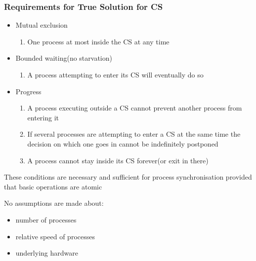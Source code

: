 \documentclass[11pt]{article}
\theoremstyle{definition}
\begin{document}
        \subsubsection{Requirements for True Solution for CS}
        \begin{itemize}
            \item Mutual exclusion
            \begin{enumerate}
                \item One process at most inside the CS at any time
            \end{enumerate}
            \item Bounded waiting(no starvation)
            \begin{enumerate}
                \item A process attempting to enter its CS will eventually do so
            \end{enumerate}
            \item Progress
            \begin{enumerate}
                \item A process executing outside a CS cannot prevent another process from entering it
                \item If several processes are attempting to enter a CS at the same time the decision on which one goes in cannot be indefinitely postponed
                \item A process cannot stay inside its CS forever(or exit in there)
            \end{enumerate}
        \end{itemize}


        These conditions are necessary and sufficient for process synchronisation provided that basic operations are atomic


        No assumptions are made about:
        \begin{itemize}
            \item number of processes
            \item relative speed of processes
            \item underlying hardware
        \end{itemize}
\end{document}
